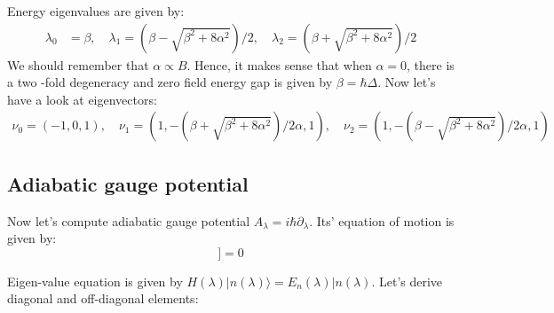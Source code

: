 \documentclass[11pt,a4paper]{article}
\begin{document}
 Energy eigenvalues are given by:
\begin{align*}
\lambda_0 &= \beta, \quad \lambda_1 = (\beta - \sqrt{\beta^2 + 8 \alpha^2})/2 , \quad  \lambda_2 = (\beta + \sqrt{\beta^2 + 8 \alpha^2})/2
\end{align*}
We should remember that $\alpha \propto B$. Hence, it makes sense that when $\alpha=0$,  there is a two -fold degeneracy and zero field energy gap is given by $\beta=\hbar \Delta$. Now let's have a look at eigenvectors:
\begin{align*}
\nu_0 = (-1,0,1), \quad \nu_1 = (1, -(\beta + \sqrt{\beta^2 + 8 \alpha^2})/2 \alpha, 1) , \quad \nu_2 = (1, -(\beta - \sqrt{\beta^2 + 8 \alpha^2})/2 \alpha, 1)
\end{align*}

\subsection{Adiabatic gauge potential}

Now let's compute adiabatic gauge potential $A_{\lambda}= i \hbar \partial_{\lambda}$. Its' equation of motion is given by:
\begin{equation}
[H, \partial_{\lambda} H +\dfrac{i}{\hbar} [A_{\lambda}, H] ]=0
\label{eom}
\end{equation}

Eigen-value equation is given by $H (\lambda) |n(\lambda) \rangle = E_n (\lambda) |n(\lambda) $. Let's derive diagonal and off-diagonal elements:
\end{document}
